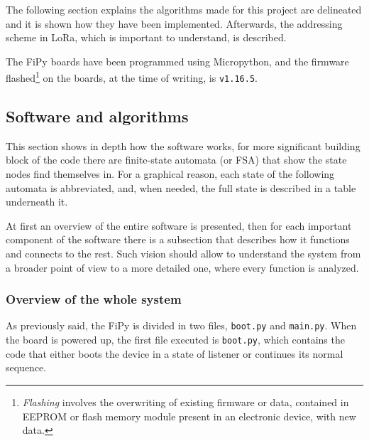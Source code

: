 		The following section explains the algorithms made for this project are delineated and it is shown how they have been implemented.
		Afterwards, the addressing scheme in LoRa, which is important to understand, is described.
		
		The FiPy boards have been programmed using Micropython, and the firmware flashed\footnote{ \textit{Flashing} involves the overwriting of existing firmware or data, contained in EEPROM or flash memory module present in an electronic device, with new data.} on the boards, at the time of writing, is \texttt{v1.16.5}.
		
		\subsection{Software and algorithms}\label{subsec:algorithms}
	
			

			This section shows in depth how the software works, for more significant building block of the code there are finite-state automata (or FSA) that show the state nodes find themselves in.
			For a graphical reason, each state of the following automata is abbreviated, and, when needed, the full state is described in a table underneath it.
			
			At first an overview of the entire software is presented, then for each important component of the software there is a subsection that describes how it functions and connects to the rest.
			Such vision should allow to understand the system from a broader point of view to a more detailed one, where every function is analyzed.
			
			\newpage
			\subsubsection{Overview of the whole system}
			
				As previously said, the FiPy is divided in two files, \texttt{boot.py} and \texttt{main.py}.
				When the board is powered up, the first file executed is \texttt{boot.py}, which contains the code that either boots the device in a state of listener or continues its normal sequence.
				

